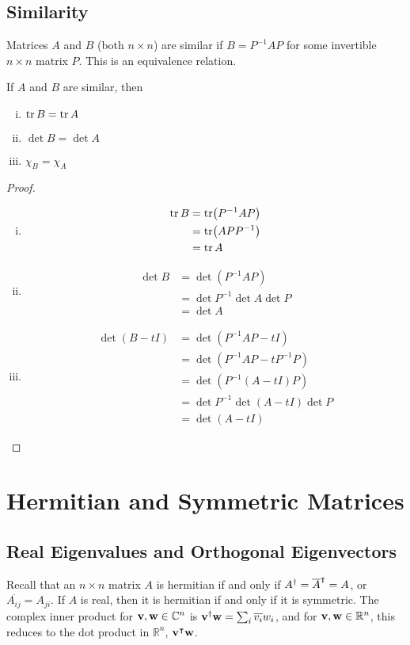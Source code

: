 \documentclass{article}
\begin{document}
\subsection{Similarity}
Matrices $A$ and $B$ (both $n \times n$) are similar if $B = P^{-1}AP$ for some invertible $n\times n$ matrix $P$. This is an equivalence relation.
\begin{proposition}
	If $A$ and $B$ are similar, then
	\begin{enumerate}[(i)]
		\item $\tr B = \tr A$
		\item $\det B = \det A$
		\item $\chi_B = \chi_A$
	\end{enumerate}
\end{proposition}
\begin{proof}
	\begin{enumerate}[(i)]
		\item \begin{align*}
			      \tr B & = \tr (P^{-1}AP) \\&= \tr(APP^{-1}) \\&= \tr A
		      \end{align*}
		\item \begin{align*}
			      \det B & = \det (P^{-1}AP) \\&= \det P^{-1} \det A \det P \\&= \det A
		      \end{align*}
		\item \begin{align*}
			      \det(B - tI) & = \det(P^{-1}AP - tI) \\&= \det(P^{-1}AP - tP^{-1}P) \\&= \det(P^{-1}(A - tI)P) \\&= \det P^{-1} \det(A - tI) \det P \\&= \det(A - tI)
		      \end{align*}
	\end{enumerate}
\end{proof}

\section{Hermitian and Symmetric Matrices}
\subsection{Real Eigenvalues and Orthogonal Eigenvectors}
Recall that an $n\times n$ matrix $A$ is hermitian if and only if $A^\dagger = \overline{A}^\intercal = A$, or $\overline{A_{ij}} = A_{ji}$. If $A$ is real, then it is hermitian if and only if it is symmetric. The complex inner product for $\vb v, \vb w \in \mathbb C^n$ is $\vb v^\dagger \vb w = \sum_i \overline{v_i}w_i$, and for $\vb v, \vb w \in \mathbb R^n$, this reduces to the dot product in $\mathbb R^n$, $\vb v^\intercal \vb w$.
\end{document}
